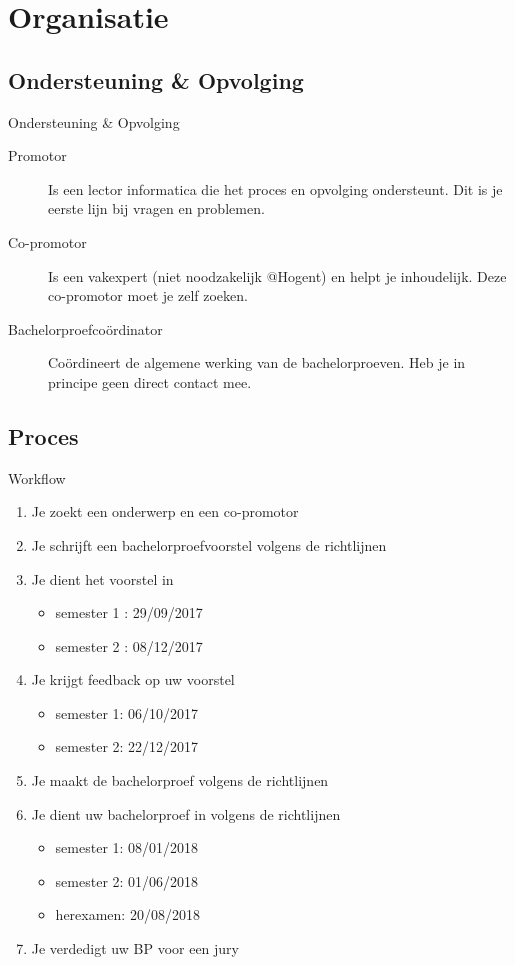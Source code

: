 \documentclass{beamer}
\newcommand{\vrstlsemeen}{29/09/2017}
\newcommand{\vrstlsemtwee}{08/12/2017}
\newcommand{\feedsemeen}{06/10/2017}
\newcommand{\feedsemtwee}{22/12/2017}
\newcommand{\deadlineeen}{08/01/2018}
\newcommand{\deadlinetwee}{01/06/2018}
\newcommand{\deadlinedrie}{20/08/2018}
\begin{document}
\section{Organisatie}
\sectionframe{}
\subsection{Ondersteuning \& Opvolging}

\begin{frame}{Ondersteuning \& Opvolging}
\begin{description}
	\item[Promotor] Is een lector informatica die het proces en opvolging ondersteunt. Dit is je eerste lijn bij vragen en problemen.
	\item[Co-promotor] Is een vakexpert (niet noodzakelijk @Hogent) en helpt je inhoudelijk. \textcolor{HoGentAccent1}{Deze co-promotor moet je zelf zoeken.}
	\item[Bachelorproefco\"ordinator] Co\"ordineert de algemene werking van de bachelorproeven. Heb je in principe geen direct contact mee.
\end{description}
\end{frame}



\subsection{Proces}
\begin{frame}{Workflow}
	\begin{enumerate}
		\item Je zoekt een onderwerp en een co-promotor
		\item Je schrijft een bachelorproefvoorstel volgens de richtlijnen
		\item Je dient het voorstel in
		\begin{itemize}
			\item semester 1 : \vrstlsemeen
			\item semester 2 : \vrstlsemtwee
		\end{itemize}
		\item  Je krijgt feedback op uw voorstel
		\begin{itemize}
			\item semester 1: \feedsemeen
			\item semester 2: \feedsemtwee
		\end{itemize} 
		\item Je maakt de bachelorproef volgens de richtlijnen
		\item Je dient uw bachelorproef in volgens de richtlijnen
		 \begin{itemize}
		 	\item semester 1: \deadlineeen
		 	\item semester 2: \deadlinetwee
		 	\item herexamen: \deadlinedrie
		 \end{itemize}
	 	\item Je verdedigt uw BP voor een jury 
	\end{enumerate}
\end{frame}
\end{document}
